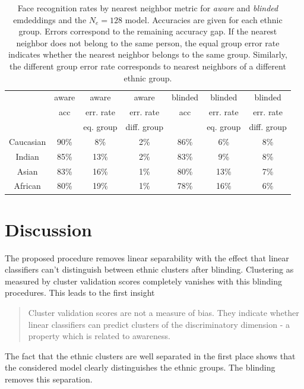\documentclass{report}
\begin{document}
\begin{table}
\begin{center}
\begin{tabular}{ c|c|c | c||c | c|c }
        & aware  & aware  & aware  & blinded  & blinded  & blinded  \\
     & acc & err. rate & err. rate & acc & err. rate & err. rate \\
     &  & eq. group  & diff. group &  & eq. group  & diff. group  \\
\hline
Caucasian & 90\% &  8\%    &  2\% & 86\%    &  6\% & 8\% \\  
Indian       & 85\% & 13\%   &  2\% & 83\%    &  9\% & 8\%\\ 
Asian        & 83\% & 16\%   &  1\% & 80\%    &  13\% & 7\%\\ 
African      & 80\% & 19\%   &  1\% & 78\%    &  16\% & 6\% 
\end{tabular}
\end{center}
\caption{Face recognition rates by nearest neighbor metric for \emph{aware}  and  \emph{blinded} emdeddings and the $N_e=128$ model. Accuracies are given for each ethnic group. Errors correspond to the remaining accuracy gap. If the nearest neighbor does not belong to the same person, the equal group error rate indicates whether the nearest neighbor belongs to the same group. Similarly, the different group error rate corresponds to nearest neighbors of a different ethnic group.}
\label{tab:nnrate}
\end{table}


\section{Discussion}

The proposed procedure removes linear separability with the effect that linear classifiers can't distinguish between ethnic clusters after blinding. Clustering as measured by cluster validation scores completely vanishes with this blinding procedures. This leads to the first insight

\begin{quote}
    Cluster validation scores are not a measure of bias. They indicate whether linear classifiers can predict clusters of the discriminatory dimension - a property which is related to awareness.
 \end{quote}

\noindent The fact that the ethnic clusters are well separated in the first place shows that the considered model clearly distinguishes the ethnic groups. The blinding removes this separation. 
\end{document}
